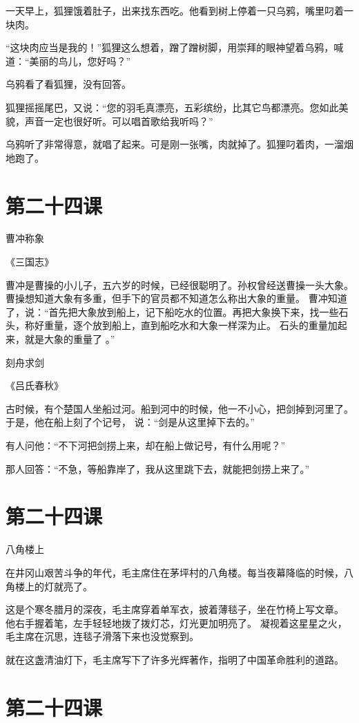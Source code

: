 \documentclass[12pt,UTF8]{ctexbook}
\begin{document}
一天早上，狐狸饿着肚子，出来找东西吃。他看到树上停着一只乌鸦，嘴里叼着一块肉。

“这块肉应当是我的！”狐狸这么想着，蹭了蹭树脚，用崇拜的眼神望着乌鸦，喊道：“美丽的鸟儿，您好吗？”

乌鸦看了看狐狸，没有回答。

狐狸摇摇尾巴，又说：“您的羽毛真漂亮，五彩缤纷，比其它鸟都漂亮。您如此美貌，声音一定也很好听。可以唱首歌给我听吗？”

乌鸦听了非常得意，就唱了起来。可是刚一张嘴，肉就掉了。狐狸叼着肉，一溜烟地跑了。

\section{第二十四课}

曹冲称象 

《三国志》

曹冲是曹操的小儿子，五六岁的时候，已经很聪明了。孙权曾经送曹操一头大象。
曹操想知道大象有多重，但手下的官员都不知道怎么称出大象的重量。
曹冲知道了，说：“首先把大象放到船上，记下船吃水的位置。再把大象换下来，找一些石头，称好重量，逐个放到船上，直到船吃水和大象一样深为止。
石头的重量加起来，就是大象的重量了  。”


刻舟求剑

《吕氏春秋》

古时候，有个楚国人坐船过河。船到河中的时候，他一不小心，把剑掉到河里了。于是，他在船上刻了个记号，
说：“剑是从这里掉下去的。”

有人问他：“不下河把剑捞上来，却在船上做记号，有什么用呢？”

那人回答：“不急，等船靠岸了，我从这里跳下去，就能把剑捞上来了。”

\section{第二十四课}

八角楼上

在井冈山艰苦斗争的年代，毛主席住在茅坪村的八角楼。每当夜幕降临的时候，八角楼上的灯就亮了。

这是个寒冬腊月的深夜，毛主席穿着单军衣，披着薄毯子，坐在竹椅上写文章。
他右手握着笔，左手轻轻地拨了拨灯芯，灯光更加明亮了。
凝视着这星星之火，毛主席在沉思，连毯子滑落下来也没觉察到。

就在这盏清油灯下，毛主席写下了许多光辉著作，指明了中国革命胜利的道路。

\section{第二十四课}
\end{document}
